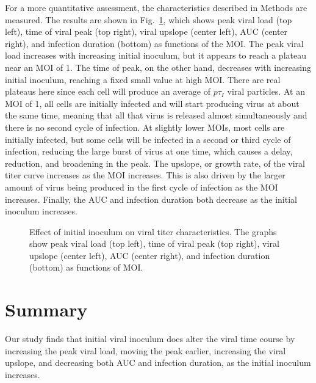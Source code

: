For a more quantitative assessment, the characteristics described in Methods are measured. The results are shown in Fig.\ \ref{results}, which shows peak viral load (top left), time of viral peak (top right), viral upslope (center left), AUC (center right), and infection duration (bottom) as functions of the MOI. The peak viral load increases with increasing initial inoculum, but it appears to reach a plateau near an MOI of 1. The time of peak, on the other hand, decreases with increasing initial inoculum, reaching a fixed small value at high MOI. There are real plateaus here since each cell will produce an average of $p\tau_I$ viral particles. At an MOI of 1, all cells are initially infected and will start producing virus at about the same time, meaning that all that virus is released almost simultaneously and there is no second cycle of infection. At slightly lower MOIs, most cells are initially infected, but some cells will be infected in a second or third cycle of infection, reducing the large burst of virus at one time, which causes a delay, reduction, and broadening in the peak. The upslope, or growth rate, of the viral titer curve increases as the MOI increases. This is also driven by the larger amount of virus being produced in the first cycle of infection as the MOI increases. Finally, the AUC and infection duration both decrease as the initial inoculum increases.  
\begin{figure}[!h]
\begin{center}
\caption{Effect of initial inoculum on viral titer characteristics. The graphs show peak viral load (top left), time of viral peak (top right), viral upslope (center left), AUC (center right), and infection duration (bottom) as functions of MOI. \label{results}}
\end{center}
\end{figure}


\section{Summary}

Our study finds that initial viral inoculum does alter the viral time course by increasing the peak viral load, moving the peak earlier, increasing the viral upslope, and decreasing both AUC and infection duration, as the initial inoculum increases. 


